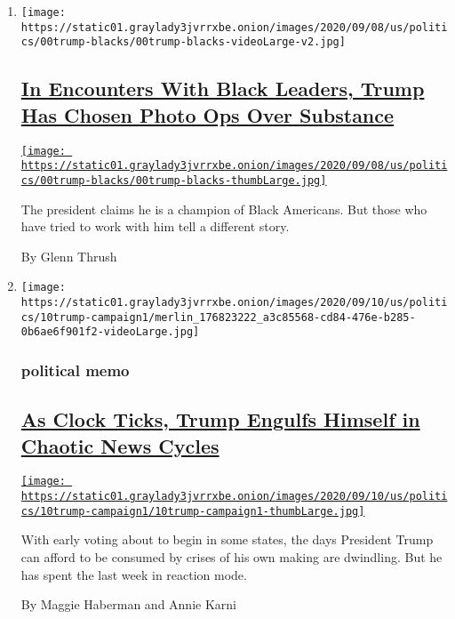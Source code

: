 \begin{enumerate}
\def\labelenumi{\arabic{enumi}.}
\item
  \texttt{[image: https://static01.graylady3jvrrxbe.onion/images/2020/09/08/us/politics/00trump-blacks/00trump-blacks-videoLarge-v2.jpg]}

  \hypertarget{in-encounters-with-black-leaders-trump-has-chosen-photo-ops-over-substance}{%
  \subsection{\texorpdfstring{\href{/2020/09/10/us/politics/trump-black-leaders.html}{In
  Encounters With Black Leaders, Trump Has Chosen Photo Ops Over
  Substance}}{In Encounters With Black Leaders, Trump Has Chosen Photo Ops Over Substance}}\label{in-encounters-with-black-leaders-trump-has-chosen-photo-ops-over-substance}}

  \href{/2020/09/10/us/politics/trump-black-leaders.html}{\texttt{[image: https://static01.graylady3jvrrxbe.onion/images/2020/09/08/us/politics/00trump-blacks/00trump-blacks-thumbLarge.jpg]}}

  The president claims he is a champion of Black Americans. But those
  who have tried to work with him tell a different story.

  By Glenn Thrush
\item
  \texttt{[image: https://static01.graylady3jvrrxbe.onion/images/2020/09/10/us/politics/10trump-campaign1/merlin\_176823222\_a3c85568-cd84-476e-b285-0b6ae6f901f2-videoLarge.jpg]}

  \hypertarget{political-memo}{%
  \subsubsection{political memo}\label{political-memo}}

  \hypertarget{as-clock-ticks-trump-engulfs-himself-in-chaotic-news-cycles}{%
  \subsection{\texorpdfstring{\href{/2020/09/10/us/politics/trump-campaign-virus-woodward.html}{As
  Clock Ticks, Trump Engulfs Himself in Chaotic News
  Cycles}}{As Clock Ticks, Trump Engulfs Himself in Chaotic News Cycles}}\label{as-clock-ticks-trump-engulfs-himself-in-chaotic-news-cycles}}

  \href{/2020/09/10/us/politics/trump-campaign-virus-woodward.html}{\texttt{[image: https://static01.graylady3jvrrxbe.onion/images/2020/09/10/us/politics/10trump-campaign1/10trump-campaign1-thumbLarge.jpg]}}

  With early voting about to begin in some states, the days President
  Trump can afford to be consumed by crises of his own making are
  dwindling. But he has spent the last week in reaction mode.

  By Maggie Haberman and Annie Karni
\end{enumerate}


